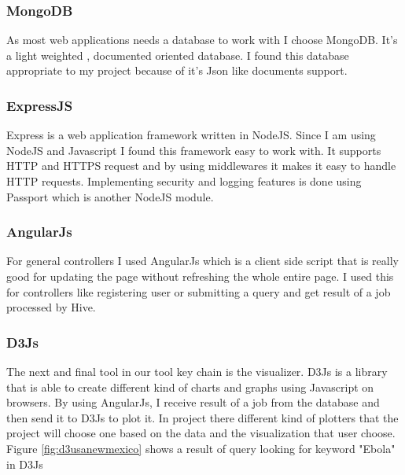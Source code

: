 \documentclass[a4paper,11pt]{report}
\begin{document}
\subsubsection{MongoDB}
As most web applications needs a database to work with I choose MongoDB. It's a light weighted , documented oriented database. I found this database appropriate to my project because of it's Json like documents support.

\subsubsection{ExpressJS}
Express is a web application framework written in NodeJS. Since I am using NodeJS and Javascript I found this framework easy to work with. It supports HTTP and HTTPS request and by using middlewares it makes it easy to handle HTTP requests. Implementing security and logging features is done using Passport which is another NodeJS module.

\subsubsection{AngularJs}
For general controllers I used AngularJs which is a client side script that is really good for updating the page without refreshing the whole entire page. I used this for controllers like registering user or submitting a query and get result of a job processed by Hive.

\subsubsection{D3Js}
The next and final tool in our tool key chain is the visualizer. D3Js is a library that is able to create different kind of charts and graphs using Javascript on browsers. By using AngularJs, I receive result of a job from the database and then send it to D3Js to plot it. In project there different kind of plotters that the project will choose one based on the data and the visualization that user choose. Figure \ref{fig:d3usanewmexico} shows a result of query looking for keyword "Ebola" in D3Js
\end{document}
